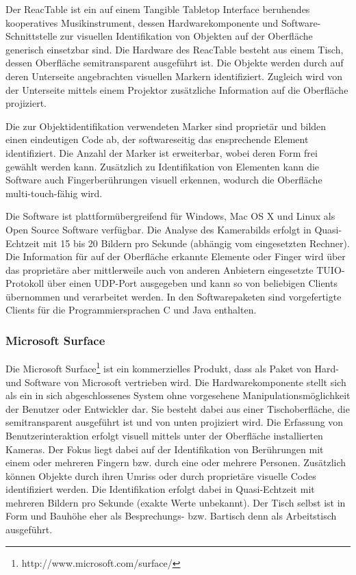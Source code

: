 Der ReacTable \citep{Kaltenbrunner06} ist ein auf einem Tangible Tabletop Interface beruhendes kooperatives Musikinstrument, dessen Hardwarekomponente und Software-Schnittstelle zur visuellen Identifikation von Objekten auf der Oberfläche generisch einsetzbar sind. Die Hardware des ReacTable besteht aus einem Tisch, dessen Oberfläche semitransparent ausgeführt ist. Die Objekte werden durch auf deren Unterseite angebrachten visuellen Markern identifiziert. Zugleich wird von der Unterseite mittels einem Projektor zusätzliche Information auf die Oberfläche projiziert.

Die zur Objektidentifikation verwendeten Marker sind proprietär und bilden einen eindeutigen Code ab, der softwareseitig das ensprechende Element identifiziert. Die Anzahl der Marker ist erweiterbar, wobei deren Form frei gewählt werden kann. Zusätzlich zu Identifikation von Elementen kann die Software auch Fingerberührungen visuell erkennen, wodurch die Oberfläche multi-touch-fähig wird.

Die Software ist plattformübergreifend für Windows, Mac OS X und Linux als Open Source Software verfügbar. Die Analyse des Kamerabilds erfolgt in Quasi-Echtzeit mit 15 bis 20 Bildern pro Sekunde (abhängig vom eingesetzten Rechner). Die Information für auf der Oberfläche erkannte Elemente oder Finger wird über das proprietäre aber mittlerweile auch von anderen Anbietern eingesetzte TUIO-Protokoll über einen \gls{UDP}-Port ausgegeben und kann so von beliebigen Clients übernommen und verarbeitet werden. In den Softwarepaketen sind vorgefertigte Clients für die Programmiersprachen C und Java enthalten.


\subsubsection{Microsoft Surface} %
\label{ssub:microsoft_surface}

Die Microsoft Surface\footnote{http://www.microsoft.com/surface/} ist ein kommerzielles Produkt, dass als Paket von Hard- und Software von Microsoft vertrieben wird. Die Hardwarekomponente stellt sich als ein in sich abgeschlossenes System ohne vorgesehene Manipulationsmöglichkeit der Benutzer oder Entwickler dar. Sie besteht dabei aus einer Tischoberfläche, die semitransparent ausgeführt ist und von unten projiziert wird. Die Erfassung von Benutzerinteraktion erfolgt visuell mittels unter der Oberfläche installierten Kameras. Der Fokus liegt dabei auf der Identifikation von Berührungen mit einem oder mehreren Fingern bzw. durch eine oder mehrere Personen. Zusätzlich können Objekte durch ihren Umriss oder durch proprietäre visuelle Codes identifiziert werden. Die Identifikation erfolgt dabei in Quasi-Echtzeit mit mehreren Bildern pro Sekunde (exakte Werte unbekannt). Der Tisch selbst ist in Form und Bauhöhe eher als Besprechungs- bzw. Bartisch denn als Arbeitstisch ausgeführt.

